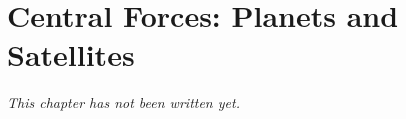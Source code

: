 \chapter{Central Forces: Planets and Satellites}\label{ch:b1:central-forces}


\emph{This chapter has not been written yet.}
